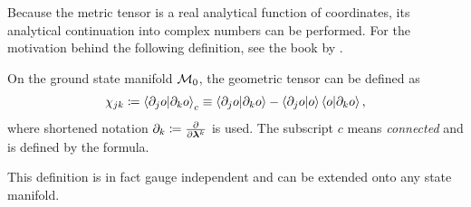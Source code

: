 
Because the metric tensor is a real analytical function of coordinates, its analytical continuation into complex numbers can be performed. For the motivation behind the following definition, see the book by \citet{cheng_quantum_2013}.

\begin{definition}
    On the ground state manifold $\mathcal{M}_0$, the geometric tensor can be defined as
    \begin{equation}
        \chi_{jk}\coloneqq \braket{\partial_j o|\partial_k o}_c \equiv \braket{\partial_j o|\partial_k o} - \braket{\partial_j o|o}\braket{o|\partial_k o},
        \label{eq:geometricTensor}
    \end{equation}
    where shortened notation $\partial_k\coloneqq\frac{\partial }{\partial {\bm\lambda}^k}$ is used. The subscript $c$ means \emph{connected} and is defined by the formula.
\end{definition}
This definition is in fact gauge independent and can be extended onto any state manifold. 

